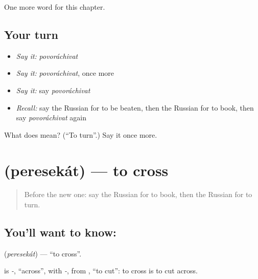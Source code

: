 \begin{grammarlens}[title={What you've built}]
One more word for this chapter.
\end{grammarlens}

\subsection*{Your turn}
\begin{itemize}
\raggedright
  \item \emph{Say it:} \emph{povoráchivat}
  \item \emph{Say it:} \emph{povoráchivat}, once more
  \item \emph{Say it:} say \emph{povoráchivat}
  \item \emph{Recall:} say the Russian for to be beaten, then the Russian for to book, then say \emph{povoráchivat} again
\end{itemize}

\begin{tcolorbox}[breakable,colback=teal!4,colframe=teal!35!black,title={Before you move on}]
What does  mean? (\textquotedblleft{}To turn\textquotedblright{}.) Say it once more.
\end{tcolorbox}
\section[\texorpdfstring{\ru{пересекать} (peresekát)}{пересекать (peresekát)}]{ (peresekát) — to cross}

\label{lesson:RU-C146-peresekat}



\begin{quote}
Before the new one: say the Russian for to book, then the Russian for to turn.
\end{quote}

\subsection*{You'll want to know: }
\textbf{} (\emph{peresekát}) — \textquotedblleft{}to cross\textquotedblright{}.

\begin{cousinweb}
\textbf{} is \emph{-}, \textquotedblleft{}across\textquotedblright{}, with \emph{-}, from \emph{}, \textquotedblleft{}to cut\textquotedblright{}: to cross is to cut across.
\end{cousinweb}

